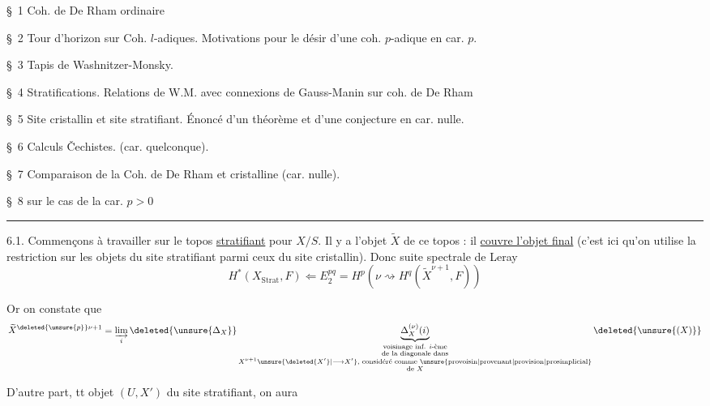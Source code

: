 \S~1 Coh. de De Rham ordinaire

\S~2 Tour d'horizon sur Coh. $l$-adiques. Motivations pour le désir d'une coh. $p$-adique en car. $p$.

\S~3 Tapis de Washnitzer-Monsky.

\S~4 Stratifications. Relations de W.M. avec connexions de Gauss-Manin sur coh. de De Rham

\S~5  Site cristallin et site stratifiant. Énoncé  d'un théorème et d'une conjecture en car. nulle.

\S~6 Calculs Čechistes. (car. quelconque).

\S~7 Comparaison de la Coh. de De Rham et cristalline (car. nulle).

\S~8   sur le cas de la car. $p>0$

\noindent\rule{\linewidth}{.4pt}


6.1. Commençons à travailler sur le topos \uline{stratifiant} pour $X/S$. Il y a l'objet $\widetilde X$ de ce topos : il \uline{couvre l'objet final} (c'est ici qu'on utilise la restriction sur les objets du site stratifiant parmi ceux du site cristallin). Donc suite spectrale de Leray
\[
H^*(X_{\mathrm{Strat}},F)\Longleftarrow E^{pq}_2=H^p(\nu\rightsquigarrow H^q(\widetilde X^{\nu+1},F))
\]

Or on constate que
\[
\widetilde X^{\deleted{\unsure{p}}\nu+1}=\varinjlim_i\deleted{\unsure{\Delta_X}}\underbrace{\Delta^{(\nu)}_X(i)}_{\substack{\text{voisinage inf. $i$-ème}\\\text{de la diagonale dans}\\ X^{\nu+1}\unsure{\deleted{X'}|\longrightarrow X'}\text{, considéré comme \unsure{provoisin|provenant|provision|prosimplicial}}\\\text{de }X}}\deleted{\unsure{(X)}}
\]

D'autre part,  tt objet $(U,X')$ 
du site stratifiant, on aura

